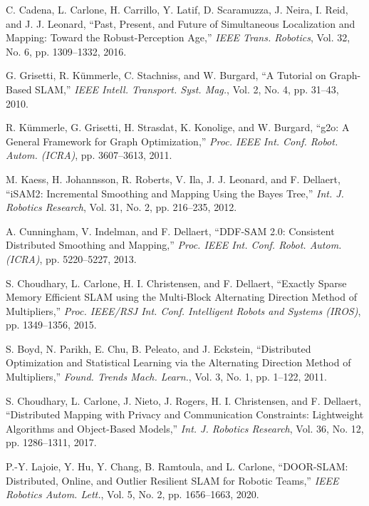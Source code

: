 \begin{thebibliography}{99}

C. Cadena, L. Carlone, H. Carrillo, Y. Latif, D. Scaramuzza, J. Neira, I. Reid, and J. J. Leonard, ``Past, Present, and Future of Simultaneous Localization and Mapping: Toward the Robust-Perception Age,'' {\it {IEEE} Trans. Robotics}, Vol. 32, No. 6, pp. 1309--1332, 2016.

G. Grisetti, R. Kümmerle, C. Stachniss, and W. Burgard, ``A Tutorial on Graph-Based {SLAM},'' {\it IEEE Intell. Transport. Syst. Mag.}, Vol. 2, No. 4, pp. 31--43, 2010.

R. Kümmerle, G. Grisetti, H. Strasdat, K. Konolige, and W. Burgard, ``{g2o}: A General Framework for Graph Optimization,'' {\it Proc. {IEEE} Int. Conf. Robot. Autom. ({ICRA})}, pp. 3607--3613, 2011.

M. Kaess, H. Johannsson, R. Roberts, V. Ila, J. J. Leonard, and F. Dellaert, ``{iSAM2}: Incremental Smoothing and Mapping Using the Bayes Tree,'' {\it Int. J. Robotics Research}, Vol. 31, No. 2, pp. 216--235, 2012.

A. Cunningham, V. Indelman, and F. Dellaert, ``{DDF-SAM} 2.0: Consistent Distributed Smoothing and Mapping,'' {\it Proc. {IEEE} Int. Conf. Robot. Autom. ({ICRA})}, pp. 5220--5227, 2013.

S. Choudhary, L. Carlone, H. I. Christensen, and F. Dellaert, ``Exactly Sparse Memory Efficient {SLAM} using the Multi-Block Alternating Direction Method of Multipliers,'' {\it Proc. {IEEE/RSJ} Int. Conf. Intelligent Robots and Systems ({IROS})}, pp. 1349--1356, 2015.

S. Boyd, N. Parikh, E. Chu, B. Peleato, and J. Eckstein, ``Distributed Optimization and Statistical Learning via the Alternating Direction Method of Multipliers,'' {\it Found. Trends Mach. Learn.}, Vol. 3, No. 1, pp. 1--122, 2011.

S. Choudhary, L. Carlone, J. Nieto, J. Rogers, H. I. Christensen, and F. Dellaert, ``Distributed Mapping with Privacy and Communication Constraints: Lightweight Algorithms and Object-Based Models,'' {\it Int. J. Robotics Research}, Vol. 36, No. 12, pp. 1286--1311, 2017.

P.-Y. Lajoie, Y. Hu, Y. Chang, B. Ramtoula, and L. Carlone, ``{DOOR-SLAM}: Distributed, Online, and Outlier Resilient {SLAM} for Robotic Teams,'' {\it {IEEE} Robotics Autom. Lett.}, Vol. 5, No. 2, pp. 1656--1663, 2020.



\end{thebibliography}

